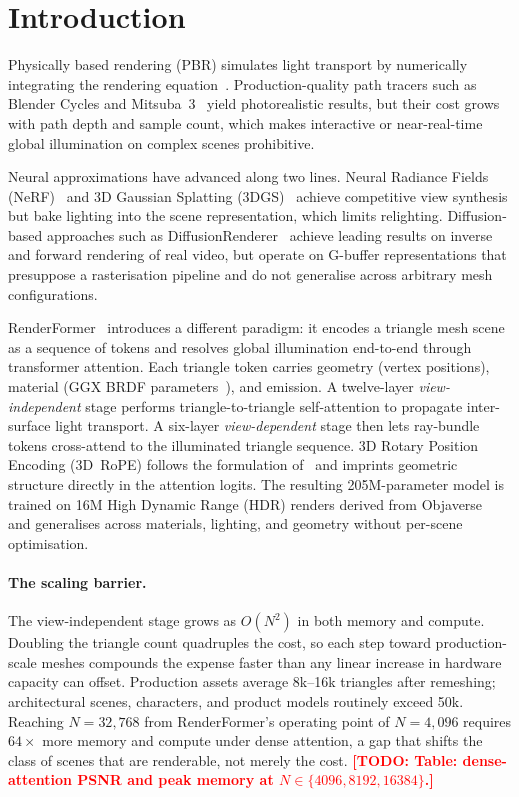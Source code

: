 \documentclass{egpubl}
\newcommand{\RF}{RenderFormer\xspace}
\newcommand{\todo}[1]{\textcolor{red}{\textbf{[TODO: #1]}}}
\begin{document}
\section{Introduction}
\label{sec:intro}

Physically based rendering (PBR) simulates light transport by numerically
integrating the rendering equation~\cite{kajiya1986rendering}.
Production-quality path tracers such as Blender Cycles and Mitsuba~3~\cite{jakob2022drjit}
yield photorealistic results, but their cost grows with path depth and
sample count, which makes interactive or near-real-time global illumination
on complex scenes prohibitive.

Neural approximations have advanced along two lines.
Neural Radiance Fields (NeRF)~\cite{mildenhall2020nerf} and 3D Gaussian
Splatting (3DGS)~\cite{kerbl2023gaussian} achieve competitive view
synthesis but bake lighting into the scene representation, which limits
relighting.
Diffusion-based approaches such as DiffusionRenderer~\cite{liang2025diffusionrenderer}
achieve leading results on inverse and forward rendering of real video, but
operate on G-buffer representations that presuppose a rasterisation
pipeline and do not generalise across arbitrary mesh configurations.

\RF~\cite{zeng2025renderformer} introduces a different paradigm:
it encodes a triangle mesh scene as a sequence of tokens and resolves
global illumination end-to-end through transformer attention.
Each triangle token carries geometry (vertex positions), material (GGX
BRDF parameters~\cite{walter2007microfacet}), and emission.
A twelve-layer \emph{view-independent} stage performs triangle-to-triangle
self-attention to propagate inter-surface light transport.
A six-layer \emph{view-dependent} stage then lets ray-bundle tokens
cross-attend to the illuminated triangle sequence.
3D Rotary Position Encoding (3D~RoPE) follows the formulation
of~\cite{su2021roformer} and imprints geometric structure directly in
the attention logits.
The resulting 205M-parameter model is trained on 16M High Dynamic Range
(HDR) renders derived from Objaverse~\cite{deitke2022objaverse} and
generalises across materials, lighting, and geometry without per-scene
optimisation.

\paragraph{The scaling barrier.}
The view-independent stage grows as $O(N^2)$ in both memory and compute.
Doubling the triangle count quadruples the cost, so each step toward
production-scale meshes compounds the expense faster than any linear
increase in hardware capacity can offset.
Production assets average 8k--16k triangles after remeshing; architectural
scenes, characters, and product models routinely exceed 50k.
Reaching $N = 32{,}768$ from \RF's operating point of $N = 4{,}096$
requires $64\times$ more memory and compute under dense attention, a gap
that shifts the class of scenes that are renderable, not merely the cost.
\todo{Table: dense-attention PSNR and peak memory at $N \in \{4096, 8192, 16384\}$.}
\end{document}
